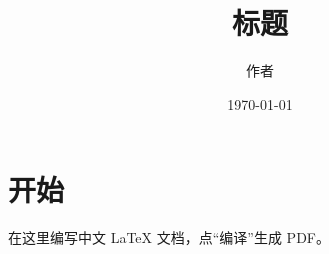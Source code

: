\documentclass[UTF8]{ctexart}
\title{标题}
\author{作者}
\date{\today}
\begin{document}
\maketitle

\section{开始}

在这里编写中文 LaTeX 文档，点“编译”生成 PDF。
\end{document}
